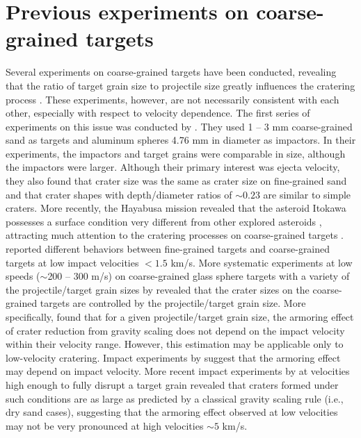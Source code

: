 \documentclass[3p,authoryear]{elsarticle}
\begin{document}
\section{Previous experiments on coarse-grained targets} \label{sec:review}
Several experiments on coarse-grained targets have been conducted, revealing that the ratio of target grain size to projectile size greatly influences the cratering process \citep{cintala1999, barnouin2005, guettler2012, holsapple2014}. These experiments, however, are not necessarily consistent with each other, especially with respect to velocity dependence. The first series of experiments on this issue was conducted by \citet{cintala1999}. They used 1 -- 3 mm coarse-grained sand as targets and aluminum spheres 4.76 mm in diameter as impactors. In their experiments, the impactors and target grains were comparable in size, although the impactors were larger. Although their primary interest was ejecta velocity, they also found that crater size was the same as crater size on fine-grained sand and that crater shapes with depth/diameter ratios of $\sim 0.23$ are similar to simple craters. More recently, the Hayabusa mission revealed that the asteroid Itokawa possesses a surface condition very different from other explored asteroids \citep[e.g.][]{fujiwara2006, saito2006}, attracting much attention to the cratering processes on coarse-grained targets \citep{barnouin2011, guettler2012, holsapple2014}. \citet{barnouin2011} reported different behaviors between fine-grained targets and coarse-grained targets at low impact velocities $<1.5$ km/s. More systematic experiments at low speeds ($\sim$200 -- 300 m/s) on coarse-grained glass sphere targets with a variety of the projectile/target grain sizes by \citet{guettler2012} revealed that the crater sizes on the coarse-grained targets are controlled by the projectile/target grain size. More specifically, \citet{guettler2012} found that for a given projectile/target grain size, the armoring effect of crater reduction from gravity scaling does not depend on the impact velocity within their velocity range. However, this estimation may be applicable only to low-velocity cratering. Impact experiments by \citet{barnouin2011} suggest that the armoring effect may depend on impact velocity. More recent impact experiments by \citet{holsapple2014} at velocities high enough to fully disrupt a target grain revealed that craters formed under such conditions are as large as predicted by a classical gravity scaling rule (i.e., dry sand cases), suggesting that the armoring effect observed at low velocities may not be very pronounced at high velocities $\sim 5$ km/s.
\end{document}
